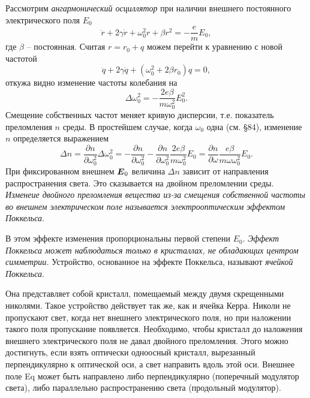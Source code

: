 


Рассмотрим \textit{ангармонический осциллятор}  при наличии внешнего постоянного электрического поля $E_0$ 
\begin{equation*}
    \ddot{r} + 2 \gamma \dot{r} + \omega_0^2 r + \beta r^2 = -\frac{e}{m}E_0,
\end{equation*}
где $\beta$ -- постоянная. Считая $r = r_0 + q$ можем перейти к уравнению с новой частотой
\begin{equation*}
    \ddot{q} + 2 \gamma \dot{q} + (\omega_0^2+ 2\beta r_0) q =0,
\end{equation*}
откужа видно изменение частоты колебания на 
\begin{equation*}
    \Delta \omega_0^2 = -\frac{2 e \beta}{m \omega_0^2} E_0^2.
\end{equation*}
Смещение собственных частот меняет кривую дисперсии, т.е. показатель преломления $n$ среды. В простейшем случае, когда $\omega_0$ одна (см. \S 84), изменение $n$ определяется выражением
\begin{equation*}
    \Delta n = \frac{\partial n}{\partial \omega_0^2} \Delta \omega_0^2 = - \frac{\partial n}{\partial \omega_0^2} 
    - \frac{\partial n}{\partial \omega_0^2} \frac{2e\beta}{m \omega_0^2} E_0 = 
    \frac{\partial n}{\partial \omega} \frac{e\beta}{m \omega \omega_0^2} E_0.
\end{equation*}
При фиксированном внешнем $\mbox{\boldmath $E$}_0$ величина $\Delta n$ зависит от направления распространения света.
Это сказывается на двойном преломлении среды. \textit{Изменеие двойного преломления вещества из-за смещения собственной частоты во внешнем электрическом поле называется электрооптическим эффектом Поккельса}.

В этом эффекте изменения пропорциональны первой степени $E_0$. \textit{Эффект Поккельса может наблюдаться только в 
кристаллах, не обладающих центром симметрии.} Устройство, основанное на эффекте Поккельса, называют \textit{ячейкой Поккельса}. 

Она представляет собой кристалл, помещаемый между двумя скрещенными николями. 
Такое устройство действует так же, как и ячейка Керра. Николи
не пропускают свет, когда нет внешнего электрического поля,
но при наложении такого поля пропускание появляется. 
Необходимо, чтобы кристалл до наложения внешнего электрического
поля не давал двойного преломления. Этого можно достигнуть,
если взять оптически одноосный кристалл, вырезанный 
перпендикулярно к оптической оси, а свет направить вдоль этой оси.
Внешнее поле Eq может быть направлено либо перпендикулярно
(поперечный модулятор света), либо параллельно 
распространению света (продольный модулятор).



